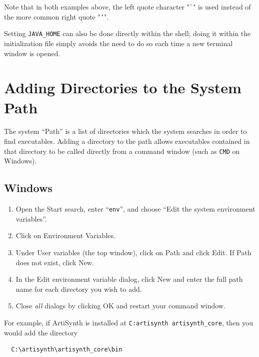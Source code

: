 \documentclass{article}
\begin{document}
Note that in both examples above, the left quote character "{\tt \`{}}" is used
instead of the more common right quote "{\tt '}".

Setting {\tt JAVA\_HOME} can also be done directly within the shell;
doing it within the initialization file simply avoids the need to do
so each time a new terminal window is opened.

\section{Adding Directories to the System Path}
\label{SettingPath}

The system ``Path'' is a list of directories which the system searches
in order to find executables. Adding a directory to the path allows
executables contained in that directory to be called directly from a
command window (such as {\tt CMD} on Windows).

\subsection{Windows}

\begin{enumerate}

\item Open the {\sf Start} search, enter ``{\tt env}'', and choose
{\sf ``Edit the system environment variables''}.

\item Click on {\sf Environment Variables}.

\item Under {\sf User variables} (the top window), click on {\sf Path}
and click {\sf Edit}. If {\sf Path} does not exist, click {\sf New}.

\item In the {\sf Edit environment variable} dialog, click {\sf New}
and enter the full path name for each directory you wish to add.

\item Close {\it all} dialogs by clicking {\sf OK} and restart 
your command window.

\end{enumerate}

For example, if ArtiSynth is installed at {\tt C:\BKS artisynth\BKS
artisynth\_core}, then you would add the directory
\begin{verbatim}
  C:\artisynth\artisynth_core\bin
\end{verbatim}
\end{document}
